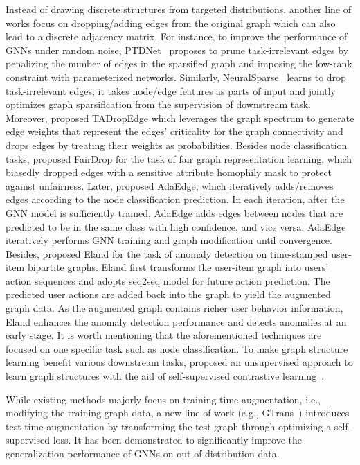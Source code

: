 \documentclass[11pt]{article}
\begin{document}
Instead of drawing discrete structures from targeted distributions, another line of works focus on dropping/adding edges from the original graph which can also lead to a discrete adjacency matrix. For instance, to improve the performance of GNNs under random noise, PTDNet~\cite{luo2021learning} proposes to prune task-irrelevant edges by penalizing the number of edges in the sparsified graph and imposing the low-rank constraint with parameterized networks.  Similarly, NeuralSparse~\cite{zheng2020robust} learns to drop task-irrelevant edges; it takes node/edge features as parts of input and jointly optimizes graph sparsification from the supervision of downstream task. Moreover, \citet{gao2021training} proposed TADropEdge which leverages the graph spectrum to generate edge weights that represent the edges' criticality for the graph connectivity and drops edges by treating their weights as probabilities. Besides node classification tasks, \citet{spinelli2021fairdrop} proposed FairDrop for the task of fair graph representation learning, which biasedly dropped edges with a sensitive attribute homophily mask to protect against unfairness. Later, \citet{chen2020measuring} proposed AdaEdge, which iteratively adds/removes edges according to the node classification prediction. In each iteration, after the GNN model is sufficiently trained, AdaEdge adds edges between nodes that are predicted to be in the same class with high confidence, and vice versa. AdaEdge iteratively performs GNN training and graph modification until convergence. Besides, \citet{zhao2021action} proposed Eland for the task of anomaly detection on time-stamped user-item bipartite graphs. Eland first transforms the user-item graph into users' action sequences and adopts seq2seq model for future action prediction. The predicted user actions are added back into the graph to yield the augmented graph data. As the augmented graph contains richer user behavior information, Eland enhances the anomaly detection performance and detects anomalies at an early stage.
It is worth mentioning that the aforementioned techniques are focused on one specific task such as node classification. To make graph structure learning benefit various downstream tasks, \citet{liu2022towards} proposed an unsupervised approach to learn graph structures with the aid of self-supervised contrastive learning~\cite{zhu2021graph}.  

While existing methods majorly focus on training-time augmentation, i.e., modifying the training graph data, a new line of work (e.g., GTrans~\cite{jin2022empowering}) introduces test-time augmentation by transforming the test graph through optimizing a self-supervised loss. It has been demonstrated to significantly improve the generalization performance of GNNs on out-of-distribution data. 
\end{document}

